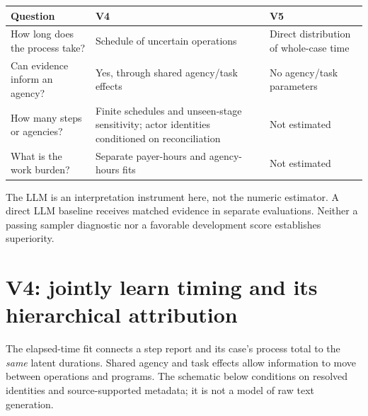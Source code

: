 \documentclass[10pt]{article}
\begin{document}
\begin{tabularx}{\linewidth}{@{}p{.28\linewidth}YY@{}}
\toprule Question & V4 & V5 \\
\midrule
How long does the process take? & Schedule of uncertain operations & Direct distribution of whole-case time \\
Can evidence inform an agency? & Yes, through shared agency/task effects & No agency/task parameters \\
How many steps or agencies? & Finite schedules and unseen-stage sensitivity; actor identities conditioned on reconciliation & Not estimated \\
What is the work burden? & Separate payer-hours and agency-hours fits & Not estimated \\
\bottomrule
\end{tabularx}

The LLM is an interpretation instrument here, not the numeric estimator. A direct
LLM baseline receives matched evidence in separate evaluations. Neither a passing
sampler diagnostic nor a favorable development score establishes superiority.

\clearpage
\section{V4: jointly learn timing and its hierarchical attribution}
\label{sec:v4}
The elapsed-time fit connects a step report and its case's process total to the
\emph{same} latent durations. Shared agency and task effects allow information to
move between operations and programs. The schematic below conditions on resolved
identities and source-supported metadata; it is not a model of raw text generation.
\end{document}

